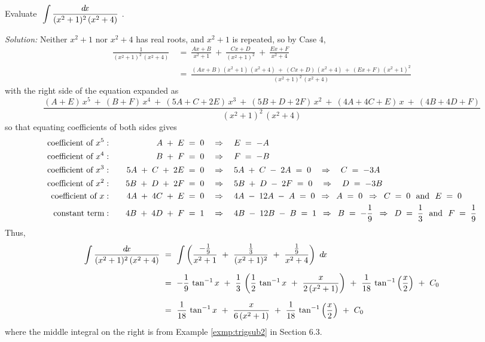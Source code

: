 \begin{exmp}\label{exmp:partfrac5}
\noindent Evaluate $~\displaystyle\int \frac{d\!x}{(x^2+1)^2\,(x^2+4)}~$.\vspace{1mm}
\par\noindent\emph{Solution:} Neither $x^2 + 1$ nor $x^2 + 4$ has real roots,
and $x^2 + 1$ is repeated, so by Case 4,
\begin{align*}
\frac{1}{(x^2+1)^2\,(x^2+4)} ~&=~ \frac{Ax+B}{x^2+1} ~+~ \frac{Cx+D}{(x^2+1)^2} ~+~
 \frac{Ex+F}{x^2+4}\\[4pt]
&=~ \frac{(Ax+B)\,(x^2+1)\,(x^2+4) ~+~ (Cx+D)\,(x^2+4) ~+~ (Ex+F)\,(x^2+1)^2}{(x^2+1)^2\,(x^2+4)}
\end{align*}
with the right side of the equation expanded as
\[
\frac{(A+E)\,x^5 ~+~ (B+F)\,x^4 ~+~ (5A+C+2E)\,x^3 ~+~ (5B+D+2F)\,x^2 ~+~ (4A+4C+E)\,x
 ~+~ (4B+4D+F)}{(x^2+1)^2\,(x^2+4)}
\]
so that equating coefficients of both sides gives
\begin{alignat*}{3}
\text{coefficient of $x^5$}&: \quad & A \;+\; E \;&=\; 0 \quad\Rightarrow\quad E \;=\; -A\\
\text{coefficient of $x^4$}&: \quad & B \;+\; F \;&=\; 0 \quad\Rightarrow\quad F \;=\; -B\\
\text{coefficient of $x^3$}&: \quad & 5A \;+\; C \;+\; 2E \;&=\; 0
 \quad\Rightarrow\quad 5A \;+\; C \;-\; 2A \;=\; 0 \quad\Rightarrow\quad C \;=\; -3A\\
\text{coefficient of $x^2$}&: \quad & 5B \;+\; D \;+\; 2F \;&=\; 0
 \quad\Rightarrow\quad 5B \;+\; D \;-\; 2F \;=\; 0 \quad\Rightarrow\quad D \;=\; -3B\\
\text{coefficient of $x$}&: \quad & 4A \;+\; 4C \;+\; E \;&=\; 0
 \quad\Rightarrow\quad 4A \;-\; 12A  \;-\; A \;=\; 0
 \enskip\Rightarrow\enskip A \;=\; 0 \enskip\Rightarrow\enskip C \;=\; 0 ~~\text{and}~~ E \;=\; 0\\
\text{constant term}&: \quad & 4B \;+\; 4D \;+\; F \;&=\; 1
 \quad\Rightarrow\quad 4B \;-\; 12B  \;-\; B \;=\; 1
 \enskip\Rightarrow\enskip B \;=\; -\frac{1}{9}
 \enskip\Rightarrow\enskip D \;=\; \frac{1}{3} ~~\text{and}~~ F \;=\; \frac{1}{9}
\end{alignat*}
Thus,
\begin{align*}
\int \frac{d\!x}{(x^2+1)^2\,(x^2+4)} ~&=~ \int \left(\frac{-\frac{1}{9}}{x^2+1} ~+~
 \frac{\frac{1}{3}}{(x^2+1)^2} ~+~ \frac{\frac{1}{9}}{x^2+4}\right)~d\!x\\[6pt]
&=~ -\frac{1}{9}\,\tan^{-1} x ~+~
     \frac{1}{3}\,\left(\frac{1}{2}\,\tan^{-1} x ~+~ \frac{x}{2\,(x^2 + 1)}\right) ~+~
     \frac{1}{18}\,\tan^{-1}\left(\frac{x}{2}\right) ~+~ C_0\\[6pt]
&=~ \frac{1}{18}\,\tan^{-1} x ~+~ \frac{x}{6\,(x^2 + 1)} ~+~
    \frac{1}{18}\,\tan^{-1}\left(\frac{x}{2}\right) ~+~ C_0
\end{align*}
where the middle integral on the right is from Example \ref{exmp:trigsub2} in
Section 6.3.
\end{exmp}
\divider
\vspace{2mm}

